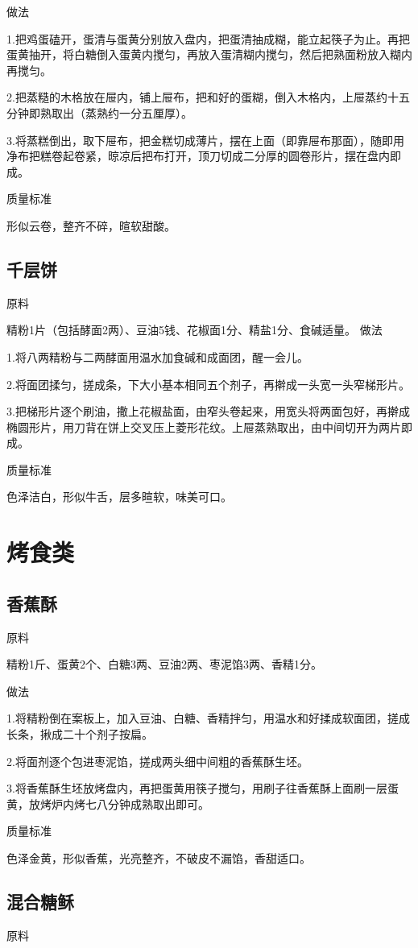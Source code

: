 \documentclass{ctexbook}
\begin{document}
做法

1.把鸡蛋磕开，蛋清与蛋黄分别放入盘内，把蛋清抽成糊，能立起筷子为止。再把蛋黄抽开，将白糖倒入蛋黄内搅匀，再放入蛋清糊内搅匀，然后把熟面粉放入糊内再搅匀。

2.把蒸糙的木格放在屉内，铺上屉布，把和好的蛋糊，倒入木格内，上屉蒸约十五分钟即熟取出（蒸熟约一分五厘厚）。

3.将蒸糕倒出，取下屉布，把金糕切成薄片，摆在上面（即靠屉布那面），随即用净布把糕卷起卷紧，晾凉后把布打开，顶刀切成二分厚的圆卷形片，摆在盘内即成。

质量标准

形似云卷，整齐不碎，暄软甜酸。
\subsection{千层饼}
原料

精粉1片（包括酵面2两）、豆油5钱、花椒面1分、精盐1分、食碱适量。
做法

1.将八两精粉与二两酵面用温水加食碱和成面团，醒一会儿。

2.将面团揉匀，搓成条，下大小基本相同五个剂子，再擀成一头宽一头窄梯形片。

3.把梯形片逐个刷油，撒上花椒盐面，由窄头卷起来，用宽头将两面包好，再擀成椭圆形片，用刀背在饼上交叉压上菱形花纹。上屉蒸熟取出，由中间切开为两片即成。

质量标准

色泽洁白，形似牛舌，层多暄软，味美可口。
\section{烤食类}
\subsection{香蕉酥}
原料

精粉1斤、蛋黄2个、白糖3两、豆油2两、枣泥馅3两、香精1分。

做法

1.将精粉倒在案板上，加入豆油、白糖、香精拌匀，用温水和好揉成软面团，搓成长条，揪成二十个剂子按扁。

2.将面剂逐个包进枣泥馅，搓成两头细中间粗的香蕉酥生坯。

3.将香蕉酥生坯放烤盘内，再把蛋黄用筷子搅匀，用刷子往香蕉酥上面刷一层蛋黄，放烤炉内烤七八分钟成熟取出即可。

质量标准

色泽金黄，形似香蕉，光亮整齐，不破皮不漏馅，香甜适口。
\subsection{混合糖稣}
原料
\end{document}
